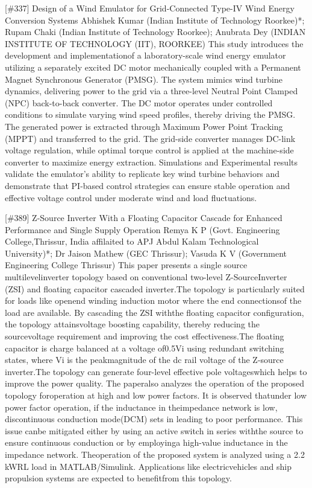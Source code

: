 {} \begin{abstract_online} {[\#337] Design of a Wind Emulator for Grid-Connected Type-IV Wind Energy Conversion Systems} {} {Abhishek Kumar (Indian Institute of Technology Roorkee)*; Rupam Chaki (Indian Institute of Technology Roorkee); Anubrata Dey (INDIAN INSTITUTE OF TECHNOLOGY (IIT),  ROORKEE)} {} This study introduces the development and implementationof a laboratory-scale wind energy emulator utilizing a separately excited DC motor mechanically coupled with a Permanent Magnet Synchronous Generator (PMSG). The system mimics wind turbine dynamics, delivering power to the grid via a three-level Neutral Point Clamped (NPC) back-to-back converter. The DC motor operates under controlled conditions to simulate varying wind speed profiles, thereby driving the PMSG. The generated power is extracted through Maximum Power Point Tracking (MPPT) and transferred to the grid. The grid-side converter manages DC-link voltage regulation, while optimal torque control is applied at the machine-side converter to maximize energy extraction. Simulations and Experimental results validate the emulator's ability to replicate key wind turbine behaviors and demonstrate that PI-based control strategies can ensure stable operation and effective voltage control under moderate wind and load fluctuations. \end{abstract_online} 
{} \begin{abstract_online} {[\#389] Z-Source Inverter With a Floating Capacitor Cascade for Enhanced Performance and Single Supply Operation} {} {Remya K P (Govt. Engineering College,Thrissur, India affilaited to  APJ Abdul Kalam Technological University)*; Dr Jaison Mathew (GEC Thrissur); Vasuda  K V (Government Engineering College Thrissur)} {} This paper presents a single source multilevelinverter topology based on conventional two-level Z-SourceInverter (ZSI) and floating capacitor cascaded inverter.The topology is particularly suited for loads like openend winding induction motor where the end connectionsof the load are available. By cascading the ZSI withthe floating capacitor configuration, the topology attainsvoltage boosting capability, thereby reducing the sourcevoltage requirement and improving the cost effectiveness.The floating capacitor is charge balanced at a voltage of0.5Vi using redundant switching states, where Vi is the peakmagnitude of the dc rail voltage of the Z-source inverter.The topology can generate four-level effective pole voltageswhich helps to improve the power quality. The paperalso analyzes the operation of the proposed topology foroperation at high and low power factors. It is observed thatunder low power factor operation, if the inductance in theimpedance network is low, discontinuous conduction mode(DCM) sets in leading to poor performance. This issue canbe mitigated either by using an active switch in series withthe source to ensure continuous conduction or by employinga high-value inductance in the impedance network. Theoperation of the proposed system is analyzed using a 2.2 kWRL load in MATLAB/Simulink. Applications like electricvehicles and ship propulsion systems are expected to benefitfrom this topology. \end{abstract_online} 
